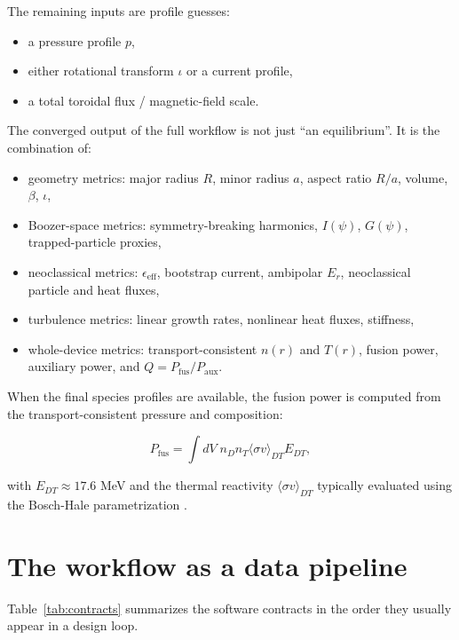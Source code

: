 \documentclass[11pt]{article}
\begin{document}
The remaining inputs are profile guesses:

\begin{itemize}
  \item a pressure profile $p$,
  \item either rotational transform $\iota$ or a current profile,
  \item a total toroidal flux / magnetic-field scale.
\end{itemize}

The converged output of the full workflow is not just ``an equilibrium''. It is
the combination of:

\begin{itemize}
  \item geometry metrics: major radius $R$, minor radius $a$, aspect ratio $R/a$, volume, $\beta$, $\iota$,
  \item Boozer-space metrics: symmetry-breaking harmonics, $I(\psi)$, $G(\psi)$, trapped-particle proxies,
  \item neoclassical metrics: $\epsilon_{\mathrm{eff}}$, bootstrap current, ambipolar $E_r$, neoclassical particle and heat fluxes,
  \item turbulence metrics: linear growth rates, nonlinear heat fluxes, stiffness,
  \item whole-device metrics: transport-consistent $n(r)$ and $T(r)$, fusion power, auxiliary power, and $Q=P_{\mathrm{fus}}/P_{\mathrm{aux}}$.
\end{itemize}

When the final species profiles are available, the fusion power is computed from
the transport-consistent pressure and composition:

\begin{equation}
P_{\mathrm{fus}} = \int dV \; n_D n_T \langle \sigma v \rangle_{DT} E_{DT},
\end{equation}

with $E_{DT}\approx 17.6$ MeV and the thermal reactivity
$\langle \sigma v \rangle_{DT}$ typically evaluated using the Bosch-Hale
parametrization \citep{BoschHale1992}.

\section{The workflow as a data pipeline}

Table~\ref{tab:contracts} summarizes the software contracts in the order they
usually appear in a design loop.
\end{document}
